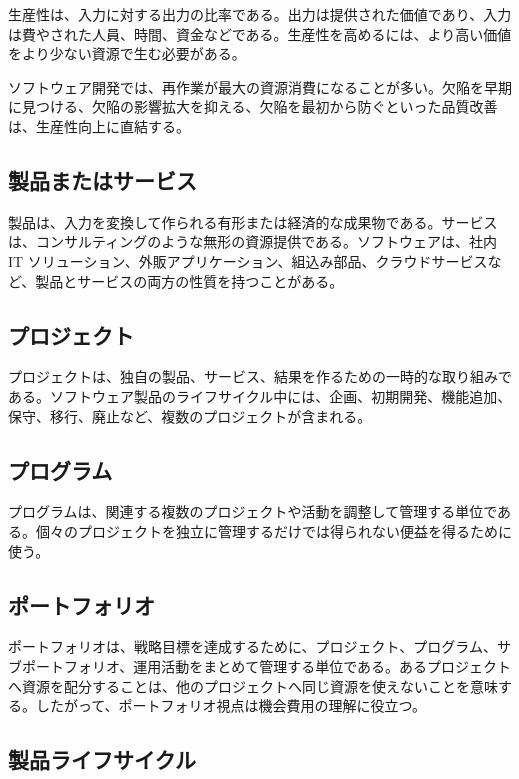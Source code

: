 \documentclass[a4paper,11pt]{article}
\begin{document}
生産性は、入力に対する出力の比率である。出力は提供された価値であり、入力は費やされた人員、時間、資金などである。生産性を高めるには、より高い価値をより少ない資源で生む必要がある。

ソフトウェア開発では、再作業が最大の資源消費になることが多い。欠陥を早期に見つける、欠陥の影響拡大を抑える、欠陥を最初から防ぐといった品質改善は、生産性向上に直結する。

\subsection{製品またはサービス}

製品は、入力を変換して作られる有形または経済的な成果物である。サービスは、コンサルティングのような無形の資源提供である。ソフトウェアは、社内 IT ソリューション、外販アプリケーション、組込み部品、クラウドサービスなど、製品とサービスの両方の性質を持つことがある。

\subsection{プロジェクト}

プロジェクトは、独自の製品、サービス、結果を作るための一時的な取り組みである。ソフトウェア製品のライフサイクル中には、企画、初期開発、機能追加、保守、移行、廃止など、複数のプロジェクトが含まれる。

\subsection{プログラム}

プログラムは、関連する複数のプロジェクトや活動を調整して管理する単位である。個々のプロジェクトを独立に管理するだけでは得られない便益を得るために使う。

\subsection{ポートフォリオ}

ポートフォリオは、戦略目標を達成するために、プロジェクト、プログラム、サブポートフォリオ、運用活動をまとめて管理する単位である。あるプロジェクトへ資源を配分することは、他のプロジェクトへ同じ資源を使えないことを意味する。したがって、ポートフォリオ視点は機会費用の理解に役立つ。

\subsection{製品ライフサイクル}
\end{document}
